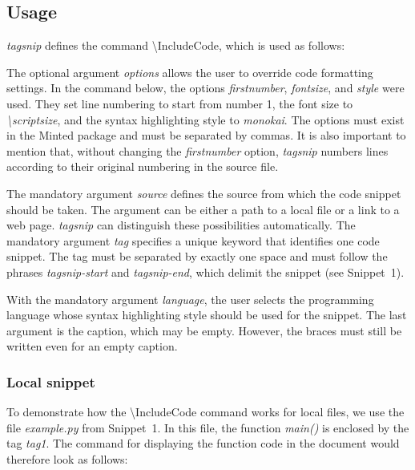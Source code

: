 \documentclass{article}
\begin{document}
\subsection*{Usage}

\textit{tagsnip} defines the command \textbackslash{}IncludeCode, which is used as follows:


The optional argument \textit{options} allows the user to override code formatting settings. 
In the command below, the options \textit{firstnumber}, \textit{fontsize}, and \textit{style} were used. 
They set line numbering to start from number 1, the font size to \nobreak\textit{\textbackslash{}scriptsize}, 
and the syntax highlighting style to \textit{monokai}. 
The options must exist in the Minted package \citep{minted} and must be separated by commas. 
It is also important to mention that, without changing the \textit{firstnumber} option, 
\textit{tagsnip} numbers lines according to their original numbering in the source file.


The mandatory argument \textit{source} defines the source from which the code snippet should be taken. 
The argument can be either a path to a local file or a link to a web page. 
\textit{tagsnip} can distinguish these possibilities automatically. 
The mandatory argument \textit{tag} specifies a unique keyword that identifies one code snippet. 
The tag must be separated by exactly one space and must follow the phrases \textit{tagsnip-start} and \textit{tagsnip-end}, 
which delimit the snippet (see Snippet~1).


With the mandatory argument \textit{language}, the user selects the programming language 
whose syntax highlighting style should be used for the snippet. 
The last argument is the caption, which may be empty. 
However, the braces must still be written even for an empty caption.

\subsubsection*{Local snippet}

To demonstrate how the \textbackslash{}IncludeCode command works for local files, 
we use the file \textit{example.py} from Snippet~1. In this file, the function \textit{main()} 
is enclosed by the tag \textit{tag1}. The command for displaying the function code in the document 
would therefore look as follows:
\end{document}
